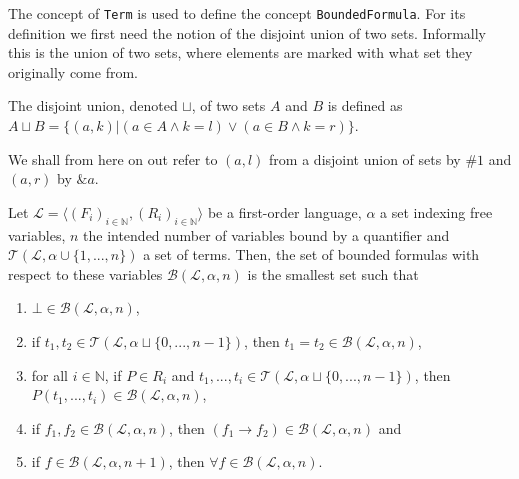 The concept of \texttt{Term} is used to define the concept \texttt{BoundedFormula}. For its definition we first need the notion of the disjoint union of two sets. Informally this is the union of two sets, where elements are marked with what set they originally come from.
\begin{definition}\label{def:Disjoint-Union}
  \leanok
  The disjoint union, denoted $\sqcup$, of two sets $A$ and $B$ is defined as $A \sqcup B = \{(a,k) | (a \in A \wedge k = l) \vee (a \in B \wedge k = r)\}$.
\end{definition}
We shall from here on out refer to $(a,l)$ from a disjoint union of sets by $\#1$ and $(a,r)$ by $\&a$. 

\begin{definition}\label{def:FO-BoundedFormula}
  \leanok
    Let $\mathcal{L} = \langle (F_i)_{i \in \mathbb{N}}, (R_i)_{i \in \mathbb{N}} \rangle$ be a first-order language, $\alpha$ a set indexing free variables, $n$ the intended number of variables bound by a quantifier and $\mathcal{T}(\mathcal{L}, \alpha \cup \{1,...,n\})$ a set of terms. Then, the set of bounded formulas with respect to these variables $\mathcal{B}(\mathcal{L},\alpha,n)$ is the smallest set such that
    \begin{enumerate}
        \item $\bot \in \mathcal{B}(\mathcal{L},\alpha,n)$,
        \item if $t_1,t_2 \in \mathcal{T}(\mathcal{L}, \alpha \sqcup \{0,...,n-1\})$, then $t_1 = t_2 \in \mathcal{B}(\mathcal{L},\alpha,n)$,
        \item for all $i \in \mathbb{N}$, if $P \in R_i$ and $t_1,...,t_i \in \mathcal{T}(\mathcal{L}, \alpha \sqcup \{0,...,n-1\})$, then $P(t_1,...,t_i) \in \mathcal{B}(\mathcal{L},\alpha,n)$,
        \item if $f_1,f_2 \in \mathcal{B}(\mathcal{L},\alpha,n)$, then $(f_1 \rightarrow f_2) \in \mathcal{B}(\mathcal{L},\alpha,n)$ and
        \item if $f \in \mathcal{B}(\mathcal{L},\alpha,n+1)$, then $\forall f \in \mathcal{B}(\mathcal{L},\alpha,n)$.
    \end{enumerate}
\end{definition}

